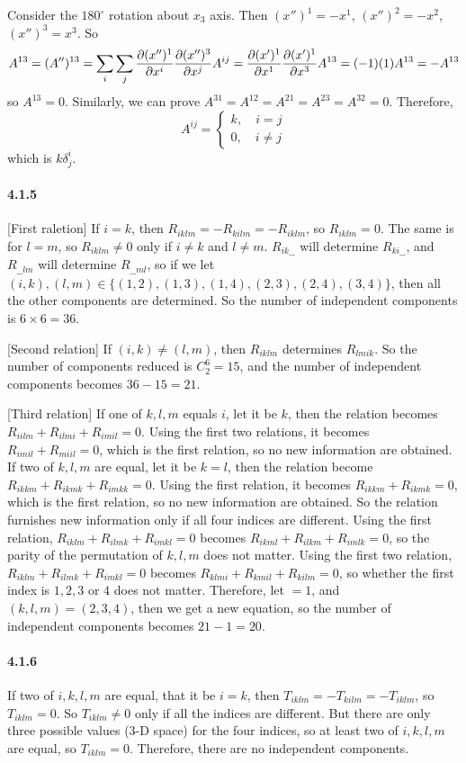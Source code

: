 \documentclass[a4paper]{article}
\begin{document}
Consider the $180^\circ$ rotation about $x_3$ axis. Then $(x'')^1=-x^1$, $(x'')^2=-x^2$, $(x'')^3=x^3$. So
\[
A^{13}=(A'')^{13}=\sum_i\sum_j\frac{\partial(x'')^1}{\partial x^i}\frac{\partial(x'')^3}{\partial x^j}A^{ij}=\frac{\partial(x')^1}{\partial x^1}\frac{\partial(x')^1}{\partial x^3}A^{13}=(-1)(1)A^{13}=-A^{13}
\]
so $A^{13}=0$. Similarly, we can prove $A^{31}=A^{12}=A^{21}=A^{23}=A^{32}=0$. Therefore, 
\[
A^{ij}=
\begin{cases}
k,\quad i=j\\
0,\quad i\neq j
\end{cases}
\]
which is $k\delta^i_j$.

\paragraph{4.1.5}
[First raletion]
If $i=k$, then $R_{iklm}=-R_{kilm}=-R_{iklm}$, so $R_{iklm}=0$. The same is for $l=m$, so $R_{iklm}\neq0$ only if $i\neq k$ and $l\neq m$. $R_{ik\_\_}$ will determine $R_{ki\_\_}$, and $R_{\_\_lm}$ will determine $R_{\_\_ml}$, so if we let $(i,k),(l,m)\in\{(1,2),(1,3),(1,4),(2,3),(2,4),(3,4)\}$, then all the other components are determined. So the number of independent components is $6\times6=36$.
\medskip

[Second relation]
If $(i,k)\neq(l,m)$, then $R_{iklm}$ determines $R_{lmik}$. So the number of components reduced is $C^6_2=15$, and the number of independent components becomes $36-15=21$.
\medskip

[Third relation]
If one of $k,l,m$ equals $i$, let it be $k$, then the relation becomes $R_{iilm}+R_{ilmi}+R_{imil}=0$. Using the first two relations, it becomes $R_{imil}+R_{miil}=0$, which is the first relation, so no new information are obtained. If two of $k,l,m$ are equal, let it be $k=l$, then the relation become $R_{ikkm}+R_{ikmk}+R_{imkk}=0$. Using the first  relation, it becomes $R_{ikkm}+R_{ikmk}=0$, which is the first relation, so no new information are obtained. So the relation furnishes new information only if all four indices are different. 
Using the first relation, $R_{iklm}+R_{ilmk}+R_{imkl}=0$ becomes $R_{ikml}+R_{ilkm}+R_{imlk}=0$, so the parity of the permutation of $k,l,m$ does not matter. 
Using the first two relation, $R_{iklm}+R_{ilmk}+R_{imkl}=0$ becomes $R_{klmi}+R_{kmil}+R_{kilm}=0$, so whether the first index is $1,2,3$ or $4$ does not matter. Therefore, let $=1$, and $(k,l,m)=(2,3,4)$, then we get a new equation, so the number of independent components becomes $21-1=20$.

\paragraph{4.1.6}
If two of $i,k,l,m$ are equal, that it be $i=k$, then $T_{iklm}=-T_{kilm}=-T_{iklm}$, so $T_{iklm}=0$. So $T_{iklm}\neq0$ only if all the indices are different. But there are only three possible values (3-D space) for the four indices, so at least two of $i,k,l,m$ are equal, so $T_{iklm}=0$. Therefore, there are no independent components.
\end{document}
